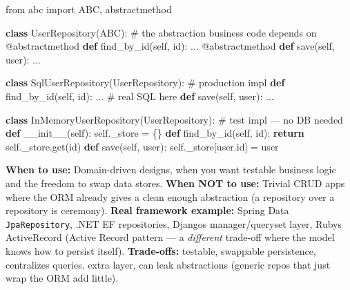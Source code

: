 \documentclass[11pt]{article}
\newenvironment{Shaded}{\begin{snugshade}}{\end{snugshade}}
\newcommand{\AttributeTok}[1]{\textcolor[rgb]{0.16,0.50,0.73}{#1}}
\newcommand{\BuiltInTok}[1]{\textcolor[rgb]{0.50,0.55,0.55}{#1}}
\newcommand{\CommentTok}[1]{\textcolor[rgb]{0.48,0.49,0.49}{#1}}
\newcommand{\ControlFlowTok}[1]{\textcolor[rgb]{0.99,0.74,0.29}{\textbf{#1}}}
\newcommand{\FunctionTok}[1]{\textcolor[rgb]{0.56,0.27,0.68}{#1}}
\newcommand{\ImportTok}[1]{\textcolor[rgb]{0.15,0.68,0.38}{#1}}
\newcommand{\KeywordTok}[1]{\textcolor[rgb]{0.81,0.81,0.76}{\textbf{#1}}}
\newcommand{\NormalTok}[1]{\textcolor[rgb]{0.81,0.81,0.76}{#1}}
\newcommand{\OperatorTok}[1]{\textcolor[rgb]{0.81,0.81,0.76}{#1}}
\newcommand{\VariableTok}[1]{\textcolor[rgb]{0.15,0.68,0.68}{#1}}
\begin{document}
\begin{Shaded}
\begin{Highlighting}[]
\ImportTok{from}\NormalTok{ abc }\ImportTok{import}\NormalTok{ ABC, abstractmethod}

\KeywordTok{class}\NormalTok{ UserRepository(ABC):                  }\CommentTok{\# the abstraction business code depends on}
    \AttributeTok{@abstractmethod}
    \KeywordTok{def}\NormalTok{ find\_by\_id(}\VariableTok{self}\NormalTok{, }\BuiltInTok{id}\NormalTok{): ...}
    \AttributeTok{@abstractmethod}
    \KeywordTok{def}\NormalTok{ save(}\VariableTok{self}\NormalTok{, user): ...}

\KeywordTok{class}\NormalTok{ SqlUserRepository(UserRepository):     }\CommentTok{\# production impl}
    \KeywordTok{def}\NormalTok{ find\_by\_id(}\VariableTok{self}\NormalTok{, }\BuiltInTok{id}\NormalTok{): ...            }\CommentTok{\# real SQL here}
    \KeywordTok{def}\NormalTok{ save(}\VariableTok{self}\NormalTok{, user): ...}

\KeywordTok{class}\NormalTok{ InMemoryUserRepository(UserRepository):  }\CommentTok{\# test impl — no DB needed}
    \KeywordTok{def} \FunctionTok{\_\_init\_\_}\NormalTok{(}\VariableTok{self}\NormalTok{): }\VariableTok{self}\NormalTok{.\_store }\OperatorTok{=}\NormalTok{ \{\}}
    \KeywordTok{def}\NormalTok{ find\_by\_id(}\VariableTok{self}\NormalTok{, }\BuiltInTok{id}\NormalTok{): }\ControlFlowTok{return} \VariableTok{self}\NormalTok{.\_store.get(}\BuiltInTok{id}\NormalTok{)}
    \KeywordTok{def}\NormalTok{ save(}\VariableTok{self}\NormalTok{, user): }\VariableTok{self}\NormalTok{.\_store[user.}\BuiltInTok{id}\NormalTok{] }\OperatorTok{=}\NormalTok{ user}
\end{Highlighting}
\end{Shaded}

\textbf{When to use:} Domain-driven designs, when you want testable business logic and the freedom to swap data stores. \textbf{When NOT to use:} Trivial CRUD apps where the ORM already gives a clean enough abstraction (a repository over a repository is ceremony). \textbf{Real framework example:} Spring Data \texttt{JpaRepository}, .NET EF repositories, Django\textquotesingle s manager/queryset layer, Ruby\textquotesingle s ActiveRecord (Active Record pattern --- a \emph{different} trade-off where the model knows how to persist itself). \textbf{Trade-offs:} testable, swappable persistence, centralizes queries. extra layer, can leak abstractions (generic repos that just wrap the ORM add little).
\end{document}
